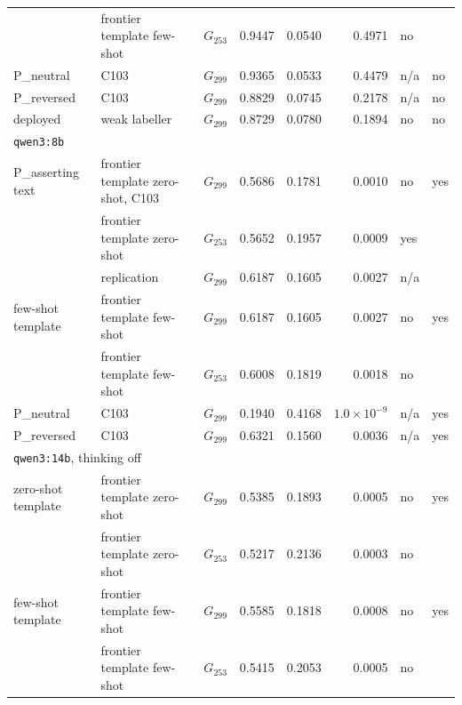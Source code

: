 \begin{table}[H]
\begin{tabular}{lllrrrll}
                  & frontier template few-shot       & $G_{253}$ & 0.9447 & 0.0540 & 0.4971 & no  & \\
P\_neutral        & C103                    & $G_{299}$ & 0.9365 & 0.0533 & 0.4479 & n/a & no \\
P\_reversed       & C103                    & $G_{299}$ & 0.8829 & 0.0745 & 0.2178 & n/a & no \\
deployed          & weak labeller           & $G_{299}$ & 0.8729 & 0.0780 & 0.1894 & no  & no \\
\midrule
\multicolumn{8}{l}{\texttt{qwen3:8b}} \\
P\_asserting text & frontier template zero-shot, C103 & $G_{299}$ & 0.5686 & 0.1781 & 0.0010 & no  & yes \\
                  & frontier template zero-shot      & $G_{253}$ & 0.5652 & 0.1957 & 0.0009 & yes & \\
                  & replication             & $G_{299}$ & 0.6187 & 0.1605 & 0.0027 & n/a & \\
few-shot template & frontier template few-shot       & $G_{299}$ & 0.6187 & 0.1605 & 0.0027 & no  & yes \\
                  & frontier template few-shot       & $G_{253}$ & 0.6008 & 0.1819 & 0.0018 & no  & \\
P\_neutral        & C103                    & $G_{299}$ & 0.1940 & 0.4168 & $1.0\times10^{-9}$ & n/a & yes \\
P\_reversed       & C103                    & $G_{299}$ & 0.6321 & 0.1560 & 0.0036 & n/a & yes \\
\midrule
\multicolumn{8}{l}{\texttt{qwen3:14b}, thinking off} \\
zero-shot template & frontier template zero-shot     & $G_{299}$ & 0.5385 & 0.1893 & 0.0005 & no  & yes \\
                   & frontier template zero-shot     & $G_{253}$ & 0.5217 & 0.2136 & 0.0003 & no  & \\
few-shot template  & frontier template few-shot      & $G_{299}$ & 0.5585 & 0.1818 & 0.0008 & no  & yes \\
                   & frontier template few-shot      & $G_{253}$ & 0.5415 & 0.2053 & 0.0005 & no  & \\
\bottomrule
\end{tabular}
\end{table}
